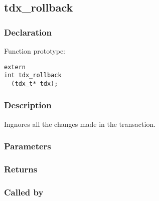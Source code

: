 
\newpage
\subsection{tdx\_rollback}
\subsubsection{Declaration} Function prototype:

\begin{verbatim}
extern
int tdx_rollback
  (tdx_t* tdx);
\end{verbatim}

\subsubsection{Description}


 Ingnores all the changes made in the transaction.
 

\subsubsection{Parameters}
\subsubsection{Returns}
\subsubsection{Called by}

